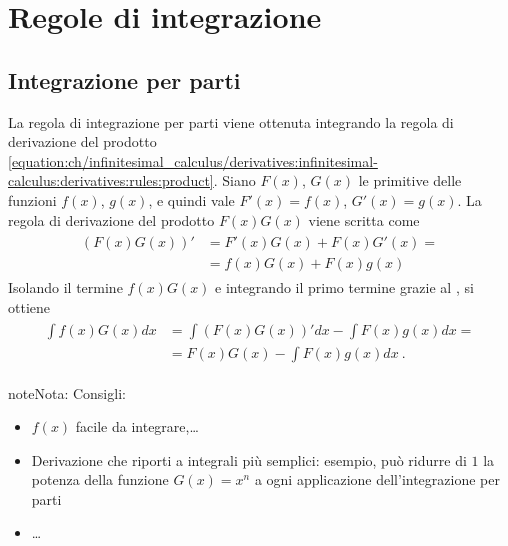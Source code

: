 \documentclass[letterpaper,10pt,italian]{jupyterBook}
\begin{document}
\section{Regole di integrazione}
\label{\detokenize{ch/infinitesimal_calculus/integrals:regole-di-integrazione}}\label{\detokenize{ch/infinitesimal_calculus/integrals:infinitesimal-calculus-integrals-rules}}

\subsection{Integrazione per parti}
\label{\detokenize{ch/infinitesimal_calculus/integrals:integrazione-per-parti}}\label{\detokenize{ch/infinitesimal_calculus/integrals:infinitesimal-calculus-integrals-by-parts}}
\sphinxAtStartPar
La regola di integrazione per parti viene ottenuta integrando la regola di derivazione del prodotto \eqref{equation:ch/infinitesimal_calculus/derivatives:infinitesimal-calculus:derivatives:rules:product}. Siano \(F(x)\), \(G(x)\) le primitive delle funzioni \(f(x)\), \(g(x)\), e quindi vale \(F'(x) = f(x)\), \(G'(x) = g(x)\).
La regola di derivazione del prodotto \(F(x)G(x)\) viene scritta come
\begin{equation*}
\begin{split}\begin{aligned}
  (F(x) G(x))' & = F'(x) G(x) + F(x) G'(x) = \\
  & = f(x) G(x) + F(x) g(x)
\end{aligned}\end{split}
\end{equation*}
\sphinxAtStartPar
Isolando il termine \(f(x)G(x)\) e integrando il primo termine grazie al {\hyperref[\detokenize{ch/infinitesimal_calculus/integrals:infinitesimal-calculus-integrals-thm-fund}]{}}, si ottiene
\begin{equation*}
\begin{split}\begin{aligned}
\int f(x) G(x) dx & = \int \left( F(x) G(x) \right)' dx - \int F(x) g(x) dx = \\
& = F(x) G(x) - \int F(x) g(x) dx  \ .
\end{aligned}\end{split}
\end{equation*}
\begin{sphinxadmonition}{note}{Nota:}
\sphinxAtStartPar
Consigli:
\begin{itemize}
\item {} 
\sphinxAtStartPar
\(f(x)\) facile da integrare,…

\item {} 
\sphinxAtStartPar
Derivazione che riporti a integrali più semplici: esempio, può ridurre di \(1\) la potenza della funzione \(G(x) = x^n\) a ogni applicazione dell’integrazione per parti

\item {} 
\sphinxAtStartPar
…

\end{itemize}
\end{sphinxadmonition}
\end{document}
